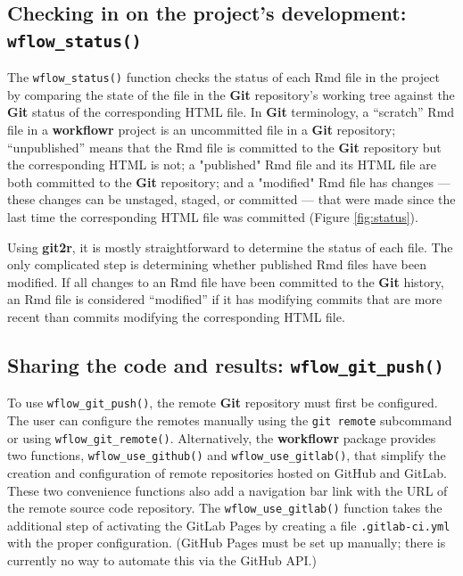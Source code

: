 \documentclass[9pt,a4paper]{extarticle}
\begin{document}
\subsection*{Checking in on the project's development: \texttt{wflow\_status()}}

The \texttt{wflow\_status()} function checks the status of each Rmd file in the
project by comparing the state of the file in the \textbf{Git} repository's
working tree against the \textbf{Git} status of the corresponding HTML file. In
 \textbf{Git} terminology, a “scratch” Rmd file in a \textbf{workflowr} project is an
uncommitted file in a \textbf{Git} repository; “unpublished” means that the Rmd
file is committed to the \textbf{Git} repository but the corresponding HTML is
not; a "published" Rmd file and its HTML file are both committed to the
 \textbf{Git} repository; and a "modified" Rmd file has changes --- these changes
can be unstaged, staged, or committed --- that were made since the last
time the corresponding HTML file was committed (Figure \ref{fig:status}).

Using \textbf{git2r}, it is mostly straightforward to determine the status of
each file. The only complicated step is determining whether published
Rmd files have been modified. If all changes to an Rmd file have been
committed to the \textbf{Git} history, an Rmd file is considered “modified” if it
has modifying commits that are more recent than commits modifying the
corresponding HTML file.

\subsection*{Sharing the code and results: \texttt{wflow\_git\_push()}}

To use \texttt{wflow\_git\_push()}, the remote \textbf{Git} repository must first be
configured. The user can configure the remotes manually using the
\texttt{git remote} subcommand or using \texttt{wflow\_git\_remote()}.
Alternatively, the \textbf{workflowr} package provides two functions,
\texttt{wflow\_use\_github()} and \texttt{wflow\_use\_gitlab()}, that simplify the creation
and configuration of remote repositories hosted on GitHub and GitLab.
These two convenience functions also add a navigation bar link with the
URL of the remote source code repository. The \texttt{wflow\_use\_gitlab()}
function takes the additional step of activating the GitLab Pages by
creating a file \texttt{.gitlab-ci.yml} with the proper configuration.
(GitHub Pages must be set up manually; there is currently no way to
automate this via the GitHub API.)
\end{document}
